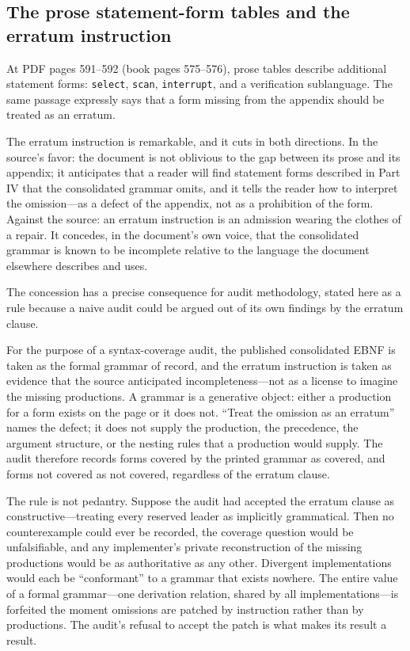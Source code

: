 \subsection{The prose statement-form tables and the erratum instruction}\label{ch10:erratum}

At PDF pages 591--592 (book pages 575--576), prose tables describe additional statement forms: \texttt{select}, \texttt{scan}, \texttt{interrupt}, and a verification sublanguage. The same passage expressly says that a form missing from the appendix should be treated as an erratum.

The erratum instruction is remarkable, and it cuts in both directions. In the source's favor: the document is not oblivious to the gap between its prose and its appendix; it anticipates that a reader will find statement forms described in Part IV that the consolidated grammar omits, and it tells the reader how to interpret the omission---as a defect of the appendix, not as a prohibition of the form. Against the source: an erratum instruction is an admission wearing the clothes of a repair. It concedes, in the document's own voice, that the consolidated grammar is known to be incomplete relative to the language the document elsewhere describes and uses.

The concession has a precise consequence for audit methodology, stated here as a rule because a naive audit could be argued out of its own findings by the erratum clause.

\begin{ruleenv}\label{ch10:rule-erratum}
For the purpose of a syntax-coverage audit, the published consolidated EBNF is taken as the formal grammar of record, and the erratum instruction is taken as evidence that the source anticipated incompleteness---not as a license to imagine the missing productions. A grammar is a generative object: either a production for a form exists on the page or it does not. ``Treat the omission as an erratum'' names the defect; it does not supply the production, the precedence, the argument structure, or the nesting rules that a production would supply. The audit therefore records forms covered by the printed grammar as covered, and forms not covered as not covered, regardless of the erratum clause.
\end{ruleenv}

The rule is not pedantry. Suppose the audit had accepted the erratum clause as constructive---treating every reserved leader as implicitly grammatical. Then no counterexample could ever be recorded, the coverage question would be unfalsifiable, and any implementer's private reconstruction of the missing productions would be as authoritative as any other. Divergent implementations would each be ``conformant'' to a grammar that exists nowhere. The entire value of a formal grammar---one derivation relation, shared by all implementations---is forfeited the moment omissions are patched by instruction rather than by productions. The audit's refusal to accept the patch is what makes its result a result.

